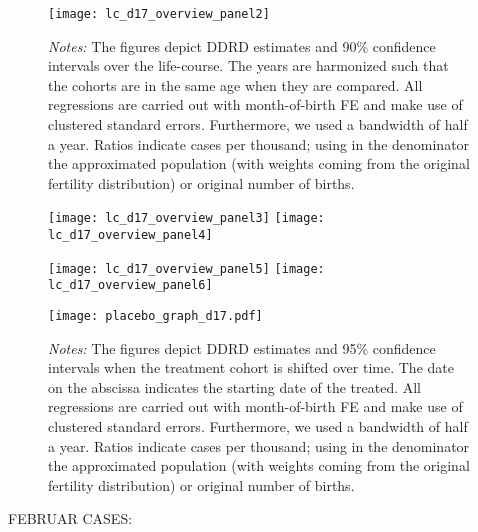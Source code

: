 \begin{landscape}
\begin{figure}[H]
\centering
\begin{minipage}{.9\linewidth}
\texttt{[image: lc\_d17\_overview\_panel2]}
{\scriptsize \emph{Notes:} The figures depict DDRD estimates and 90\% confidence intervals over the life-course. The years are harmonized such that the cohorts are in the same age when they are compared. All regressions are carried out with month-of-birth FE and make use of clustered standard errors. Furthermore, we used a bandwidth of half a year. Ratios indicate cases per thousand; using in the denominator the approximated population (with weights coming from the original fertility distribution) or original number of births. \par}
\end{minipage}
\end{figure}
\end{landscape}
\begin{figure}[H]%
	\centering
	\texttt{[image: lc\_d17\_overview\_panel3]}
	\texttt{[image: lc\_d17\_overview\_panel4]}
\end{figure}
\begin{figure}[H]
	\centering	
	\texttt{[image: lc\_d17\_overview\_panel5]}
	\texttt{[image: lc\_d17\_overview\_panel6]}
\end{figure}

\newpage
\begin{landscape}
\begin{figure}[H]
	\centering
    \begin{minipage}{.9\linewidth}
	\texttt{[image: placebo\_graph\_d17.pdf]}
    {\scriptsize \emph{Notes:} The figures depict DDRD estimates and 95\% confidence intervals when the treatment cohort is shifted over time. The date on the abscissa indicates the starting date of the treated.  All regressions are carried out with month-of-birth FE and make use of clustered standard errors. Furthermore, we used a bandwidth of half a year. Ratios indicate cases per thousand; using in the denominator the approximated population (with weights coming from the original fertility distribution) or original number of births. \par}
    \end{minipage}
\end{figure}
\end{landscape}



\begin{landscape}

\end{landscape}
\begin{landscape}

\end{landscape}
\newpage
FEBRUAR CASES:


